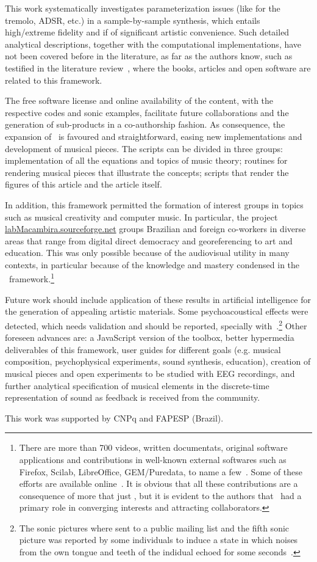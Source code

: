 This work systematically investigates parameterization issues (like for the tremolo, ADSR, etc.) in a sample-by-sample synthesis, which entails high/extreme fidelity and if of significant artistic convenience. Such detailed analytical descriptions, together with the computational implementations, have not been covered before in the literature, as far as the authors know, such as testified in the literature review~\cite{dissertacao}, where the books, articles and open software are related to this framework.

The free software license and online availability of the content,
with the respective codes and sonic examples, facilitate future collaborations and the generation of sub-products in a co-authorship fashion.
As consequence, the expansion of \massa\ is favoured and straightforward, easing new implementations and development of musical pieces.
The scripts can be divided in three groups: implementation of all the equations and topics of music theory; routines for rendering musical pieces that illustrate the concepts; scripts that render the figures of this article and the article itself.

In addition, this framework permitted the formation of interest groups in topics such as musical creativity and computer music.
In particular, the project \url{labMacambira.sourceforge.net} groups Brazilian and foreign co-workers
in diverse areas that range from digital direct democracy and georeferencing to art and education.
This was only possible because of the audiovisual utility in many contexts, in particular because of the knowledge and mastery condensed in the \massa\ framework.\footnote{There are more than 700 videos, written documentats,
 original software applications and contributions in well-known external softwares such as Firefox, Scilab, LibreOffice, GEM/Puredata, to name a few~\cite{siteLM,wikiLM,vimeoLM}.
Some of these efforts are available online~\cite{dissertacao}.
It is obvious that all these contributions are a consequence of more that just \massa, but it is evident to the authors that \massa\ had a primary role in converging interests and attracting collaborators.}

Future work should include application of these results in artificial intelligence
for the generation of appealing artistic materials. Some psychoacoustical effects were detected,
which needs validation and should be reported, specially with~\cite{quadrosSonoros}.\footnote{The sonic pictures where sent to a public mailing list and the fifth sonic picture was reported by some individuals to induce a state in which noises from the own tongue and teeth of the indidual echoed for some seconds~\cite{quadrosMetarec}.} Other foreseen advances
are: a JavaScript version of the toolbox, better hypermedia deliverables of this framework, user guides
for different goals (e.g. musical composition, psychophysical experiments, sound synthesis, education), creation
of musical pieces and open experiments to be studied with EEG recordings, and further analytical specification of musical
elements in the discrete-time representation of sound as feedback is received from the community.

\begin{acks}
This work was supported by CNPq and FAPESP (Brazil).
\end{acks}


% 


